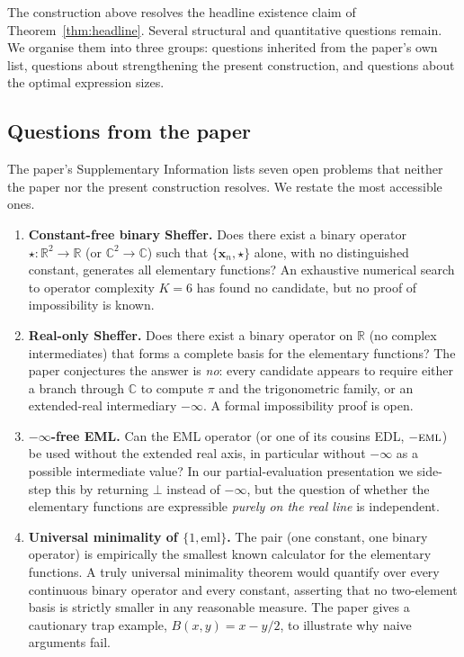 \documentclass[11pt]{article}
\theoremstyle{plain}
\theoremstyle{definition}
\begin{document}
The construction above resolves the headline existence claim of
Theorem~\ref{thm:headline}. Several structural and quantitative
questions remain. We organise them into three groups: questions
inherited from the paper's own list, questions about strengthening
the present construction, and questions about the optimal expression
sizes.

\subsection*{Questions from the paper}

The paper's Supplementary Information lists seven open problems that
neither the paper nor the present construction resolves. We restate
the most accessible ones.

\begin{enumerate}[topsep=2pt, itemsep=4pt, label=\textbf{P\arabic*}]
\item \textbf{Constant-free binary Sheffer.}
  Does there exist a binary operator $\star : \mathbb{R}^2 \to \mathbb{R}$
  (or $\mathbb{C}^2 \to \mathbb{C}$) such that $\{\mathbf{x}_n, \star\}$
  alone, with no distinguished constant, generates all elementary
  functions? An exhaustive numerical search to operator complexity
  $K = 6$ has found no candidate, but no proof of impossibility is
  known.

\item \textbf{Real-only Sheffer.}
  Does there exist a binary operator on $\mathbb{R}$ (no complex
  intermediates) that forms a complete basis for the elementary
  functions? The paper conjectures the answer is \emph{no}: every
  candidate appears to require either a branch through $\mathbb{C}$
  to compute $\pi$ and the trigonometric family, or an extended-real
  intermediary $-\infty$. A formal impossibility proof is open.

\item \textbf{$-\infty$-free EML.}
  Can the EML operator (or one of its cousins EDL, $-\textsc{eml}$) be
  used without the extended real axis, in particular without
  $-\infty$ as a possible intermediate value? In our partial-evaluation
  presentation we side-step this by returning $\bot$ instead of
  $-\infty$, but the question of whether the elementary functions are
  expressible \emph{purely on the real line} is independent.

\item \textbf{Universal minimality of $\{1, \mathrm{eml}\}$.}
  The pair (one constant, one binary operator) is empirically the
  smallest known calculator for the elementary functions. A truly
  universal minimality theorem would quantify over every continuous
  binary operator and every constant, asserting that no two-element
  basis is strictly smaller in any reasonable measure. The paper gives
  a cautionary trap example, $B(x, y) = x - y/2$, to illustrate why
  naive arguments fail.


\end{enumerate}
\end{document}

